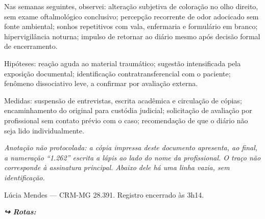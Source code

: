 \noindent Nas semanas seguintes, observei: alteração subjetiva de coloração no olho direito, sem exame oftalmológico conclusivo; percepção recorrente de odor adocicado sem fonte ambiental; sonhos repetitivos com vala, enfermaria e formulário em branco; hipervigilância noturna; impulso de retornar ao diário mesmo após decisão formal de encerramento.

\noindent Hipóteses: reação aguda ao material traumático; sugestão intensificada pela exposição documental; identificação contratransferencial com o paciente; fenômeno dissociativo leve, a confirmar por avaliação externa.

\noindent Medidas: suspensão de entrevistas, escrita acadêmica e circulação de cópias; encaminhamento do original para custódia judicial; solicitação de avaliação por profissional sem contato prévio com o caso; recomendação de que o diário não seja lido individualmente.

\noindent \textit{Anotação não protocolada: a cópia impressa deste documento apresenta, ao final, a numeração ``1.262'' escrita a lápis ao lado do nome da profissional. O traço não corresponde à assinatura principal. Abaixo dele há uma linha vazia, sem identificação.}

\noindent Lúcia Mendes --- CRM-MG 28.391. Registro encerrado às 3h14.

\noindent\textit{\textbf{↪ Rotas:}  \rotasep {} \rotasep {}}
